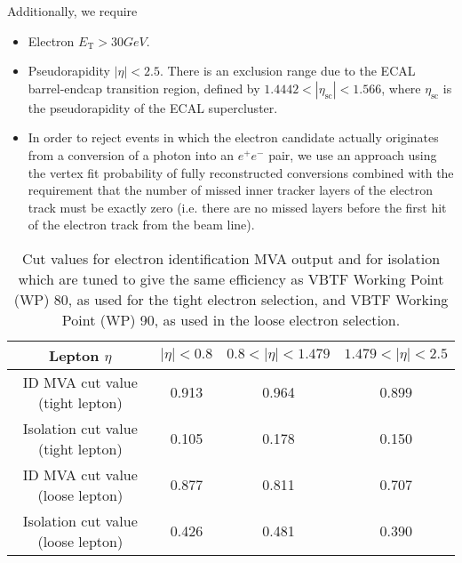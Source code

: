 Additionally, we require
\begin{itemize}
\item Electron $E_\mathrm{T} > 30GeV$.%
\item Pseudorapidity $|\eta| < 2.5$. There is an exclusion range due
        to the ECAL barrel-endcap transition region, defined by
        $1.4442 < |\eta_{\mathrm{sc}}| < 1.566$, where
        $\eta_{\mathrm{sc}}$ is the pseudorapidity of the ECAL
        supercluster.


\item
In order to reject events in which the electron candidate actually
originates from a conversion of a photon into an $e^{+}e^{-}$ pair, we
use an approach using the vertex fit probability of fully
reconstructed conversions combined with the requirement that the
number of missed inner tracker layers of the electron track must be
exactly zero (i.e. there are no missed layers before the first hit of
the electron track from the beam line).
\end{itemize}

\begin{table}[bthp]
\begin{center}
{\footnotesize
\begin{tabular}{|c|c|c|c|}
\hline
Lepton $\eta$ & $|\eta| < 0.8$ & $0.8 < |\eta| < 1.479$ & $1.479 < |\eta| < 2.5$  \\
\hline
ID MVA cut value (tight lepton) & 0.913 & 0.964 & 0.899 \\
Isolation cut value (tight lepton) & 0.105 & 0.178 & 0.150 \\
ID MVA cut value (loose lepton) & 0.877 & 0.811 & 0.707 \\
Isolation cut value (loose lepton) & 0.426 & 0.481 & 0.390 \\
\hline
\end{tabular}
\caption[.]{\label{tab:EleID} Cut values for electron identification
MVA output and for isolation which are tuned to give the same
efficiency as VBTF Working Point (WP) 80, as used for the tight
electron selection, and VBTF Working Point (WP) 90, as used in the
loose electron selection.}}
\end{center}
\end{table}


